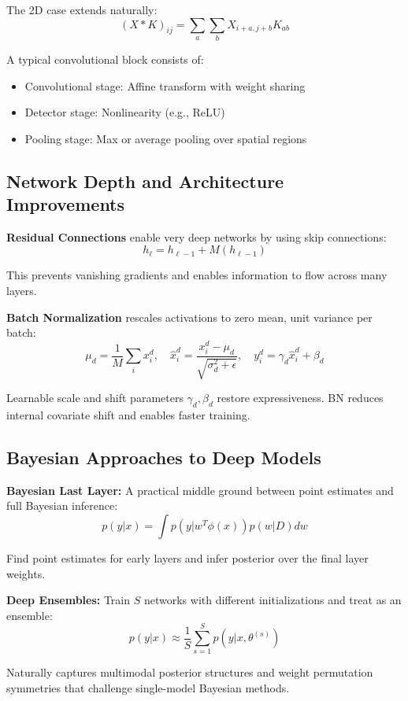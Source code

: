\documentclass[12pt,a4paper]{article}
\theoremstyle{definition}
\begin{document}
The 2D case extends naturally:
\[
(X * K)_{ij} = \sum_a \sum_b X_{i+a,j+b} K_{ab}
\]

A typical convolutional block consists of:
\begin{itemize}
  \item Convolutional stage: Affine transform with weight sharing
  \item Detector stage: Nonlinearity (e.g., ReLU)
  \item Pooling stage: Max or average pooling over spatial regions
\end{itemize}

\subsection{Network Depth and Architecture Improvements}

\textbf{Residual Connections} enable very deep networks by using skip connections:
\[
h_\ell = h_{\ell-1} + M(h_{\ell-1})
\]

This prevents vanishing gradients and enables information to flow across many layers.

\textbf{Batch Normalization} rescales activations to zero mean, unit variance per batch:
\[
\mu_d = \frac{1}{M} \sum_i x_i^d, \quad \hat{x}_i^d = \frac{x_i^d - \mu_d}{\sqrt{\sigma_d^2 + \epsilon}}, \quad y_i^d = \gamma_d \hat{x}_i^d + \beta_d
\]

Learnable scale and shift parameters $\gamma_d, \beta_d$ restore expressiveness. BN reduces internal covariate shift and enables faster training.

\subsection{Bayesian Approaches to Deep Models}

\textbf{Bayesian Last Layer:} A practical middle ground between point estimates and full Bayesian inference:
\[
p(y|x) = \int p(y | w^T \phi(x)) p(w|D) dw
\]

Find point estimates for early layers and infer posterior over the final layer weights.

\textbf{Deep Ensembles:} Train $S$ networks with different initializations and treat as an ensemble:
\[
p(y|x) \approx \frac{1}{S} \sum_{s=1}^S p(y|x, \theta^{(s)})
\]

Naturally captures multimodal posterior structures and weight permutation symmetries that challenge single-model Bayesian methods.
\end{document}
